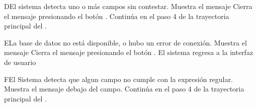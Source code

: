 \begin{UCtrayectoriaA}{D}{El sistema detecta uno o más campos sin contestar.}
	\UCpaso Muestra el mensaje 
	\UCpaso[\UCactor] Cierra el mensaje presionando el botón .
    \UCpaso Continúa en el paso 4 de la trayectoria principal del .
\end{UCtrayectoriaA}
\begin{UCtrayectoriaA}{E}{La base de datos no está disponible, o hubo un error de conexión.}
	\UCpaso Muestra el mensaje 
	\UCpaso[\UCactor] Cierra el mensaje presionando el botón .
	\UCpaso El sistema regresa a la interfaz de usuario 
\end{UCtrayectoriaA}
\begin{UCtrayectoriaA}{F}{El Sistema detecta que algun campo no cumple con la expresión regular.}
	\UCpaso Muestra el mensaje  debajo del campo.
	\UCpaso Continúa en el paso 4 de la trayectoria principal del .
\end{UCtrayectoriaA}